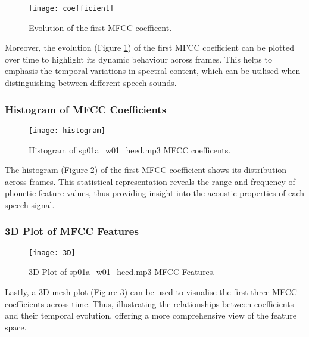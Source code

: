 \documentclass{article}
\begin{document}
\begin{figure}[!h]
  \begin{center}
  \texttt{[image: coefficient]}
  \end{center}
  \caption{\label{fig:coefficient} Evolution of the first MFCC coefficent.}
  \end{figure}

Moreover, the evolution (Figure \ref{fig:coefficient}) of the first MFCC coefficient can be plotted over time to highlight its dynamic behaviour across frames. This helps to emphasis the temporal variations in spectral content, which can be utilised when distinguishing between different speech sounds.




\subsubsection{Histogram of MFCC Coefficients}

\begin{figure}[!h]
\begin{center}
\texttt{[image: histogram]}
\end{center}
\caption{\label{fig:histogram} Histogram of sp01a\_w01\_heed.mp3 MFCC coefficents.}
\end{figure}

The histogram (Figure \ref{fig:histogram}) of the first MFCC coefficient shows its distribution across frames. This statistical representation reveals the range and frequency of phonetic feature values, thus providing insight into the acoustic properties of each speech signal.


\subsubsection{3D Plot of MFCC Features}

\begin{figure}[!h]
\begin{center}
\texttt{[image: 3D]}
\end{center}
\caption{\label{fig:3D} 3D Plot of sp01a\_w01\_heed.mp3 MFCC Features.}
\end{figure}

Lastly, a 3D mesh plot (Figure \ref{fig:3D}) can be used to visualise the first three MFCC coefficients across time. Thus, illustrating the relationships between coefficients and their temporal evolution, offering a more comprehensive view of the feature space.
\end{document}
